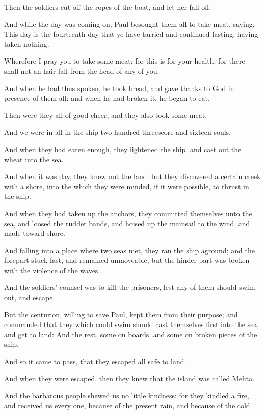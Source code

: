 \Verse Then the soldiers cut off the ropes of the boat, and let her fall off.

\Verse And while the day was coming on, Paul besought them all to take meat, saying, This day is the fourteenth day that ye have tarried and continued fasting, having taken nothing.

\Verse Wherefore I pray you to take some meat: for this is for your health: for there shall not an hair fall from the head of any of you.

\Verse And when he had thus spoken, he took bread, and gave thanks to God in presence of them all: and when he had broken it, he began to eat.

\Verse Then were they all of good cheer, and they also took some meat.

\Verse And we were in all in the ship two hundred threescore and sixteen souls.

\Verse And when they had eaten enough, they lightened the ship, and cast out the wheat into the sea.

\Verse And when it was day, they knew not the land: but they discovered a certain creek with a shore, into the which they were minded, if it were possible, to thrust in the ship.

\Verse And when they had taken up the anchors, they committed themselves unto the sea, and loosed the rudder bands, and hoised up the mainsail to the wind, and made toward shore.

\Verse And falling into a place where two seas met, they ran the ship aground; and the forepart stuck fast, and remained unmoveable, but the hinder part was broken with the violence of the waves.

\Verse And the soldiers' counsel was to kill the prisoners, lest any of them should swim out, and escape.

\Verse But the centurion, willing to save Paul, kept them from their purpose; and commanded that they which could swim should cast themselves first into the sea, and get to land: \Verse And the rest, some on boards, and some on broken pieces of the ship.

And so it came to pass, that they escaped all safe to land.


\Chapter
\Verse And when they were escaped, then they knew that the island was called Melita.

\Verse And the barbarous people shewed us no little kindness: for they kindled a fire, and received us every one, because of the present rain, and because of the cold.


